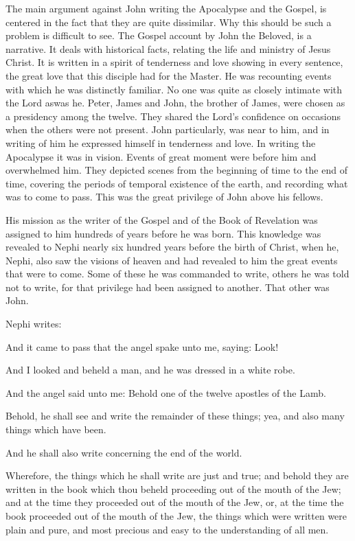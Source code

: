 The main argument against John writing the Apocalypse and the Gospel, is centered in the
fact that they are quite dissimilar. Why this should be such a problem is difficult to see. The
Gospel account by John the Beloved, is a narrative. It deals with historical facts, relating the
life and ministry of Jesus Christ. It is written in a spirit of tenderness and love showing in
every sentence, the great love that this disciple had for the Master. He was recounting events
with which he was distinctly familiar. No one was quite as closely intimate with the Lord aswas he. Peter, James and John, the brother of James, were chosen as a presidency among the
twelve. They shared the Lord's confidence on occasions when the others were not present.
John particularly, was near to him, and in writing of him he expressed himself in tenderness
and love. In writing the Apocalypse it was in vision. Events of great moment were before
him and overwhelmed him. They depicted scenes from the beginning of time to the end of
time, covering the periods of temporal existence of the earth, and recording what was to
come to pass. This was the great privilege of John above his fellows.

His mission as the writer of the Gospel and of the Book of Revelation was assigned to him
hundreds of years before he was born. This knowledge was revealed to Nephi nearly six
hundred years before the birth of Christ, when he, Nephi, also saw the visions of heaven and
had revealed to him the great events that were to come. Some of these he was commanded to
write, others he was told not to write, for that privilege had been assigned to another. That
other was John.

Nephi writes:

And it came to pass that the angel spake unto me, saying: Look!

And I looked and beheld a man, and he was dressed in a white robe.

And the angel said unto me: Behold one of the twelve apostles of the Lamb.

Behold, he shall see and write the remainder of these things; yea, and also many things which
have been.

And he shall also write concerning the end of the world.

Wherefore, the things which he shall write are just and true; and behold they are written in
the book which thou beheld proceeding out of the mouth of the Jew; and at the time they
proceeded out of the mouth of the Jew, or, at the time the book proceeded out of the mouth of
the Jew, the things which were written were plain and pure, and most precious and easy to
the understanding of all men.

